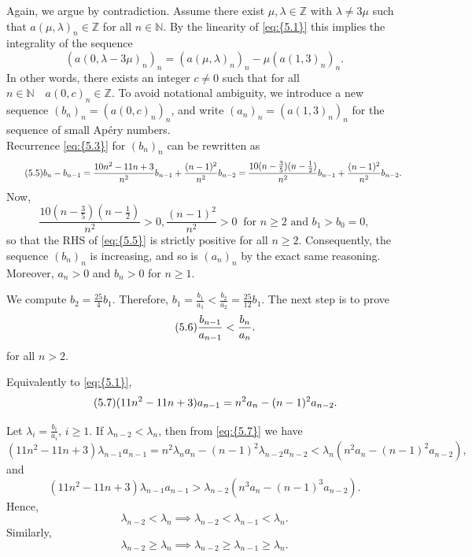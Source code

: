 \documentclass[11pt]{article}
\theoremstyle{definition}
\theoremstyle{plain}
\theoremstyle{remark}
\begin{document}
Again, we argue by contradiction. Assume there exist $\mu,\lambda \in \mathbb{Z}$ with $\lambda \neq 3\mu$ such that $a(\mu,\lambda)_n \in \mathbb{Z}$ for all $n \in \mathbb{N}$. By the linearity of \eqref{eq:{5.1}} this implies the integrality of the sequence 
\[(a(0,\lambda-3\mu)_n)_n = (a(\mu,\lambda)_n)_n - \mu(a(1,3)_n)_n.\]
In other words, there exists an integer $c \neq 0$ such that for all$n \in \mathbb{N}\quad a(0,c)_n \in \mathbb{Z}$. To avoid notational ambiguity, we introduce a new sequence $(b_n)_n = (a(0,c)_n)_n$, and write $(a_n)_n = (a(1,3)_n)_n$ for the sequence of small Apéry numbers.\\
Recurrence \eqref{eq:{5.3}} for $(b_n)_n$ can be rewritten as
\begin{equation}\label{eq:{5.5}}\tag{5.5}
b_n - b_{n-1} = \frac{10n^2-11n+3}{n^2}b_{n-1} + \frac{(n-1)^2}{n^2}b_{n-2} = \frac{10(n-\frac{3}{5})(n-\frac{1}{2})}{n^2}b_{n-1} + \frac{(n-1)^2}{n^2}b_{n-2}.
\end{equation}
Now, 
\[\frac{10(n-\frac{3}{5})(n-\frac{1}{2})}{n^2} > 0, \frac{(n-1)^2}{n^2}>0 \ \text{ for } n \geq 2 \text{ and } b_1>b_0=0,\]
so that the RHS of \eqref{eq:{5.5}} is strictly positive for all $n \geq 2$. Consequently, the sequence $(b_n)_n$ is increasing, and so is $(a_n)_n$ by the exact same reasoning. Moreover, $a_n > 0$ and $b_n > 0$ for $n \geq 1$.

We compute $b_2 = \frac{25}{4}b_1$. Therefore, $b_1 = \frac{b_1}{a_1} < \frac{b_2}{a_2} = \frac{25}{12}b_1$. The next step is to prove
\begin{equation}\label{eq:{5.6}}\tag{5.6}
\frac{b_{n-1}}{a_{n-1}} < \frac{b_n}{a_n}.
\end{equation}
for all $n>2$.

Equivalently to \eqref{eq:{5.1}},
\begin{equation}\label{eq:{5.7}}\tag{5.7}
(11n^2 - 11n + 3)a_{n-1} = n^2 a_n - (n-1)^2 a_{n-2}.
\end{equation}

Let $\lambda_i = \frac{b_i}{a_i}$, $i \geq 1$. If $\lambda_{n-2} < \lambda_n$, then from \eqref{eq:{5.7}} we have
\[
(11n^2 - 11n + 3) \lambda_{n-1} a_{n-1} = n^2 \lambda_n a_n - (n-1)^2 \lambda_{n-2} a_{n-2}
< \lambda_n (n^2 a_n - (n-1)^2 a_{n-2}),
\]
and
\[
(11n^2 - 11n + 3) \lambda_{n-1} a_{n-1} > \lambda_{n-2} (n^3 a_n - (n-1)^3 a_{n-2}).
\]
Hence,
\[
\lambda_{n-2} < \lambda_n \implies \lambda_{n-2} < \lambda_{n-1} < \lambda_n.
\]
Similarly,
\[
\lambda_{n-2} \geq \lambda_n \implies \lambda_{n-2} \geq \lambda_{n-1} \geq \lambda_n.
\]
\end{document}
